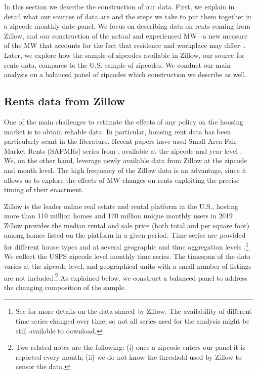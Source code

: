 
In this section we describe the construction of our data. First, we explain in detail
what our sources of data are and the steps we take to put them together in a zipcode
monthly date panel. We focus on describing data on rents coming from Zillow, and our
construction of the actual and experienced MW --a new measure of the MW that accounts
for the fact that residence and workplace may differ--. Later, we explore how the 
sample of zipcodes available in Zillow, our source for rents data, compares to the 
U.S. sample of zipcodes. We conduct our main analysis on a balanced panel of zipcodes 
which construction we describe as well.

\subsection{Rents data from Zillow}

One of the main challenges to estimate the effects of any policy on the housing market
is to obtain reliable data. In particular, housing rent data has been particularly scant
in the literature. Recent papers have used Small Area Fair Market Rents (SAFMRs) series 
from \textcite{hud}, available at the zipcode and year level \parencite{Tidemann2018, 
Yamagishi2019}. We, on the other hand, leverage newly available data from Zillow at the 
zipcode and month level. The high frequency of the Zillow data is an advantage, since it 
allows us to explore the effects of MW changes on rents exploiting the precise timing of 
their enactment.

Zillow is the leader online real estate and rental platform in the U.S., hosting more 
than 110 million homes and 170 million unique monthly users in 2019 
\parencite{ZillowFacts}. Zillow provides the median rental and sale price (both 
total and per square foot) among homes listed on the platform in a given period. Time 
series are provided for different house types and at several geographic and time 
aggregation levels \parencite{ZillowData}.\footnote{See \textcite{ZillowData} for 
	more details on the data shared by Zillow. The availability of different time 
	series changed over time, so not all series used for the analysis might be still 
	available to download.} 
We collect the USPS zipcode level monthly time series. The timespan of the data 
varies at the zipcode level, and geographical units with a small number of listings
are not included.\footnote{Two related notes are the following: (i) once a zipcode 
	enters our panel it is reported every month; (ii) we do not know the threshold
	used by Zillow to censor the data.} 
As explained below, we construct a balanced panel to address the changing composition 
of the sample.

